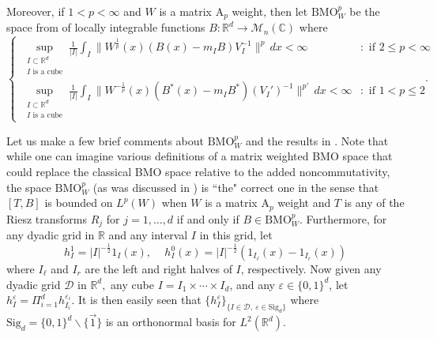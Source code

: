 \documentclass[12pt,reqno ]{amsart}
\numberwithin{equation}{section}
\theoremstyle{definition}
\newcommand{\R}{\ensuremath{\mathbb{R}}}
\newcommand{\Rd}{\ensuremath{\mathbb{R}^d}}
\newcommand{\D}{\ensuremath{\mathscr{D}}}
\newcommand{\BMOW}{\ensuremath{{\text{BMO}}_W ^p}}
\newcommand{\Mn}{\ensuremath{\mathcal{M}_{n }}(\mathbb{C})}
\renewcommand{\S}{\ensuremath{\text{Sig}_d}}
\begin{document}
Moreover, if $1 < p < \infty$ and $W$ is a matrix A${}_p$ weight, then let $\BMOW$ be the space from \cite{IKP} of locally integrable functions $B : \Rd \rightarrow \Mn$ where  \begin{equation*}     \left\{
     \begin{array}{lr}
     \displaystyle   \sup_{\substack{I \subset \R^d \\  I \text{ is a cube}}} \frac{1}{|I|} \int_I \|W^\frac{1}{p} (x) (B(x) - m_I B) V_I ^{-1}  \|^p \, dx < \infty  & :\text{ if } 2 \leq p  < \infty \\
     \displaystyle   \sup_{\substack{I \subset \R^d \\  I \text{ is a cube}}} \frac{1}{|I|} \int_I \|W^{-\frac{1}{p}} (x) (B^* (x) - m_I B^*) (V_I ')^{-1}  \|^{p'} \, dx < \infty & : \text{ if } 1 < p \leq 2
     \end{array}
   \right..
\end{equation*}

 Let us make a few brief comments about $\BMOW$ and the results in \cite{IKP}.  Note that while one can imagine various definitions of a matrix weighted BMO space that could replace the classical BMO space relative to the added noncommutativity,  the space $\BMOW$ (as was discussed in \cite{IKP}) is ``the" correct one in the sense that $[T, B]$ is bounded on $L^p(W)$ when $W$ is a matrix A${}_p$ weight and $T$ is any of the Riesz transforms $R_j$ for $j = 1, \dots, d$ if and only if $B \in \BMOW$. Furthermore, for any dyadic grid in $\mathbb{R}$ and any interval $I$ in this grid, let  \begin{equation*} h_I ^1 = |I|^{-\frac{1}{2}} 1_I (x), \,  \,  \,  \, \, \, \,  h_I ^0 (x) = |I|^{-\frac{1}{2}} (1_{I_\ell} (x) - 1_{I_r} (x))  \end{equation*} where $I_\ell$ and $I_r$ are the left and right halves of $I$, respectively.  Now given any dyadic grid $\D$ in $\mathbb{R}^d,$  any cube $I = I_1 \times \cdots \times I_d$, and any $\varepsilon \in \{0, 1\}^{d}$, let $h_I ^\varepsilon = \Pi_{i = 1}^d h_{I_i} ^{\varepsilon_i}$.  It is then easily seen that $\{h_I ^\varepsilon\}_{\{I \in \D, \  \varepsilon \in \S\}}$  where $\S = \{0, 1\}^d \backslash \{\vec{1}\}$ is an orthonormal basis for $L^2(\Rd)$.
\end{document}
